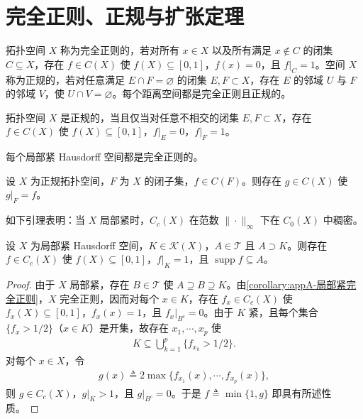 \documentclass[../main.tex]{subfiles}
\begin{document}
\section{完全正则、正规与扩张定理}\label{section:appA-正则正规}

\begin{definition}[完全正则与正规]\label{definition:appA-完全正则正规}
拓扑空间 $X$ 称为完全正则的，若对所有 $x\in X$ 以及所有满足 $x\notin C$ 的闭集 $C\subseteq X$，存在 $f\in C(X)$ 使 $f(X)\subseteq[0,1]$，$f(x)=0$，且 $f|_C=1$。空间 $X$ 称为正规的，若对任意满足 $E\cap F=\varnothing $ 的闭集 $E,F\subset X$，存在 $E$ 的邻域 $U$ 与 $F$ 的邻域 $V$，使 $U\cap V=\varnothing $。每个距离空间都是完全正则且正规的。
\end{definition}

\begin{proposition}[Urysohn 引理]\label{proposition:appA-Urysohn}
拓扑空间 $X$ 是正规的，当且仅当对任意不相交的闭集 $E,F\subset X$，存在 $f\in C(X)$ 使 $f(X)\subseteq[0,1]$，$f|_E=0$，$f|_F=1$。
\end{proposition}

\begin{corollary}\label{corollary:appA-局部紧完全正则}
每个局部紧 Hausdorff 空间都是完全正则的。
\end{corollary}

\begin{proposition}\label{proposition:appA-Tietze}
设 $X$ 为正规拓扑空间，$F$ 为 $X$ 的闭子集，$f\in C(F)$。则存在 $g\in C(X)$ 使 $g|_F=f$。
\end{proposition}

如下引理表明：当 $X$ 局部紧时，$C_c(X)$ 在范数 $\|\cdot\|_\infty$ 下在 $C_0(X)$ 中稠密。

\begin{lemma}\label{lemma:appA-Urysohn}
\label{lemma:appA-光滑截断}
设 $X$ 为局部紧 Hausdorff 空间，$K\in\mathcal{K}(X)$，$A\in\mathscr{T}$ 且 $A\supset K$。则存在 $f\in C_c(X)$ 使 $f(X)\subseteq[0,1]$，$f|_K=1$，且 $\operatorname{supp}f\subseteq A$。
\end{lemma}

\begin{proof}
由于 $X$ 局部紧，存在 $B\in\mathscr{T}$ 使 $A\supseteq B\supseteq K$。由\cref{corollary:appA-局部紧完全正则}，$X$ 完全正则，因而对每个 $x\in K$，存在 $f_x\in C_c(X)$ 使 $f_x(X)\subseteq[0,1]$，$f_x(x)=1$，且 $f_x|_{B^c}=0$。由于 $K$ 紧，且每个集合 $\{f_x>1/2\}$（$x\in K$）是开集，故存在 $x_1,\cdots ,x_p$ 使
\begin{align*}
K\subseteq\bigcup_{k=1}^p\{f_{x_k}>1/2\}.
\end{align*}
对每个 $x\in X$，令
\begin{align*}
g(x)\triangleq 2\max\{f_{x_1}(x),\cdots ,f_{x_p}(x)\},
\end{align*}
则 $g\in C_c(X)$，$g|_K>1$，且 $g|_{B^c}=0$。于是 $f\triangleq \min\{1,g\}$ 即具有所述性质。
\end{proof}
\end{document}
